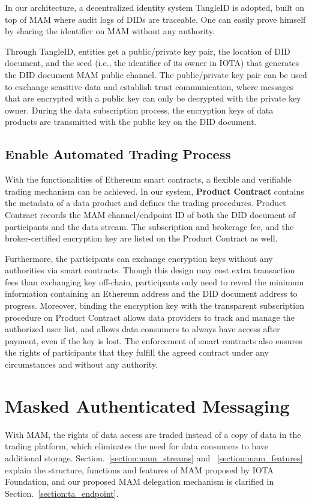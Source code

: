 \documentclass[10pt, conference, compsocconf]{IEEEtran}
\begin{document}
In our architecture, a decentralized identity system TangleID\cite{TangleID} is adopted, built on top of MAM where audit logs of DIDs are traceable. One can easily prove himself by sharing the identifier on MAM without any authority.

Through TangleID, entities get a public/private key pair, the location of DID document, and the seed (i.e., the identifier of its owner in IOTA) that generates the DID document MAM public channel. The public/private key pair can be used to exchange sensitive data and establish trust communication, where messages that are encrypted with a public key can only be decrypted with the private key owner. During the data subscription process, the encryption keys of data products are transmitted with the public key on the DID document.

\subsection{Enable Automated Trading Process}
With the functionalities of Ethereum smart contracts, a flexible and verifiable trading mechanism can be achieved. In our system, \textbf{Product Contract} contains the metadata of a data product and defines the trading procedures. Product Contract records the MAM channel/endpoint ID of both the DID document of participants and the data stream. The subscription and brokerage fee, and the broker-certified encryption key are listed on the Product Contract as well.

Furthermore, the participants can exchange encryption keys without any authorities via smart contracts. Though this design may cost extra transaction fees than exchanging key off-chain, participants only need to reveal the minimum information containing an Ethereum address and the DID document address to progress. Moreover, binding the encryption key with the transparent subscription procedure on Product Contract allows data providers to track and manage the authorized user list, and allows data consumers to always have access after payment, even if the key is lost. The enforcement of smart contracts also ensures the rights of participants that they fulfill the agreed contract under any circumstances and without any authority.

\section{Masked Authenticated Messaging}
\label{section:MAM}
With MAM, the rights of data access are traded instead of a copy of data in the trading platform, which eliminates the need for data consumers to have additional storage. Section.~\ref{section:mam_streams} and ~\ref{section:mam_features} explain the structure, functions and features of MAM proposed by IOTA Foundation, and our proposed MAM delegation mechanism is clarified in Section.~\ref{section:ta_endpoint}.
\end{document}
